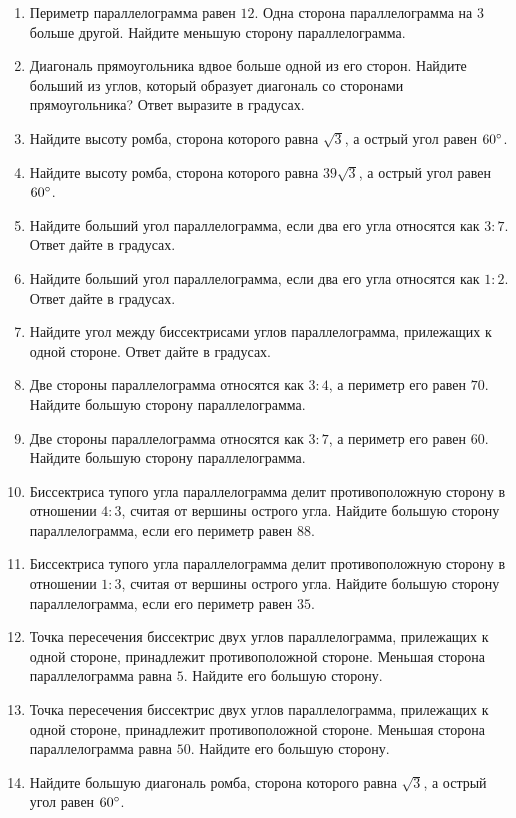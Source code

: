 \documentclass[12pt, a4paper]{article}
\begin{document}
\begin{enumerate}
		\item Периметр параллелограмма равен \( 12 \). Одна сторона параллелограмма на \( 3 \) больше другой. Найдите меньшую сторону параллелограмма.
		\item Диагональ прямоугольника вдвое больше одной из его сторон. Найдите больший из углов, который образует диагональ со сторонами прямоугольника? Ответ выразите в градусах.
		\item Найдите высоту ромба, сторона которого равна \( \sqrt{3} \), а острый угол равен \( 60\degree\).
		\item Найдите высоту ромба, сторона которого равна \( 39\sqrt{3} \), а острый угол равен \( 60 \degree \).
		\item Найдите больший угол параллелограмма, если два его угла относятся как \( 3 : 7 \). Ответ дайте в градусах.
		\item Найдите больший угол параллелограмма, если два его угла относятся как \( 1 : 2 \). Ответ дайте в градусах.
		\item Найдите угол между биссектрисами углов параллелограмма, прилежащих к одной стороне. Ответ дайте в градусах.
		\item Две стороны параллелограмма относятся как \(3:4\), а периметр его равен \( 70 \). Найдите большую сторону параллелограмма.
		\item Две стороны параллелограмма относятся как \(3:7\), а периметр его равен \( 60 \). Найдите большую сторону параллелограмма.
		\item Биссектриса тупого угла параллелограмма делит противоположную сторону в отношении \(4:3\), считая от вершины острого угла. Найдите большую сторону параллелограмма, если его периметр равен \( 88 \).
		\item Биссектриса тупого угла параллелограмма делит противоположную сторону в отношении \( 1 : 3 \), считая от вершины острого угла. Найдите большую сторону параллелограмма, если его периметр равен \( 35 \).
		\item Точка пересечения биссектрис двух углов параллелограмма, прилежащих к одной стороне, принадлежит противоположной стороне. Меньшая сторона параллелограмма равна \( 5 \). Найдите его большую сторону.
		\item Точка пересечения биссектрис двух углов параллелограмма, прилежащих к одной стороне, принадлежит противоположной стороне. Меньшая сторона параллелограмма равна \( 50 \). Найдите его большую сторону.
		\item Найдите большую диагональ ромба, сторона которого равна \( \sqrt{3} \), а острый угол равен \( 60\degree \).

\end{enumerate}
\end{document}
